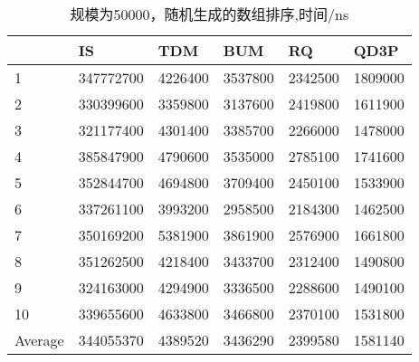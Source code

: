 \documentclass[12pt,a4paper]{ctexart}
\begin{document}
\begin{table}[H]
    \setlength{\abovecaptionskip}{0cm}
    \setlength{\belowcaptionskip}{0.5cm}
    \small
    \centering
    \caption[short]{规模为50000，随机生成的数组排序,时间/ns}
    \begin{tabular}{|l|l|l|l|l|l|}
        \hline
                & IS        & TDM     & BUM     & RQ      & QD3P    \\ \hline
        1       & 347772700 & 4226400 & 3537800 & 2342500 & 1809000 \\ \hline
        2       & 330399600 & 3359800 & 3137600 & 2419800 & 1611900 \\ \hline
        3       & 321177400 & 4301400 & 3385700 & 2266000 & 1478000 \\ \hline
        4       & 385847900 & 4790600 & 3535000 & 2785100 & 1741600 \\ \hline
        5       & 352844700 & 4694800 & 3709400 & 2450100 & 1533900 \\ \hline
        6       & 337261100 & 3993200 & 2958500 & 2184300 & 1462500 \\ \hline
        7       & 350169200 & 5381900 & 3861900 & 2576900 & 1661800 \\ \hline
        8       & 351262500 & 4218400 & 3433700 & 2312400 & 1490800 \\ \hline
        9       & 324163000 & 4294900 & 3336500 & 2288600 & 1490100 \\ \hline
        10      & 339655600 & 4633800 & 3466800 & 2370100 & 1531800 \\ \hline
        Average & 344055370 & 4389520 & 3436290 & 2399580 & 1581140 \\ \hline
    \end{tabular}
\end{table}
\end{document}

